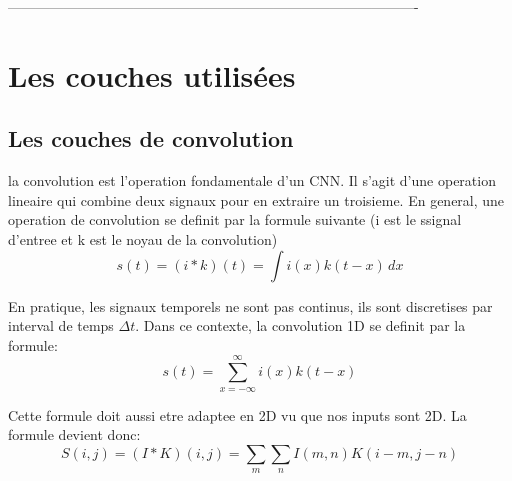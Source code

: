 % 
% 

----------------------------------------------------------------------------------------

\section{Les couches utilisées}

\subsection{Les couches de convolution}
la convolution est l'operation fondamentale d'un CNN. Il s'agit d'une operation lineaire qui combine deux signaux pour en extraire un troisieme. En general, une operation de convolution se definit par la formule suivante (i est le ssignal d'entree et k est le noyau de la convolution)
$$ s(t) = (i * k)(t) = \int i(x)k(t-x) \, dx $$

En pratique, les signaux temporels ne sont pas continus, ils sont discretises par interval de temps $\Delta t$. Dans ce contexte, la convolution 1D se definit par la formule:
\begin{equation}
 s(t) = \sum_{x=-\infty}^{\infty} i(x)k(t-x)
 \label{eqn:Conv1D}
\end{equation}

Cette formule doit aussi etre adaptee en 2D vu que nos inputs sont 2D. La formule devient donc:
\begin{equation}
 S(i,j) = (I * K)(i,j) = \sum_{m}\sum_{n} I(m,n)K(i-m,j-n)
 \label{eqn:Conv2D}
\end{equation}

